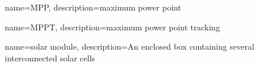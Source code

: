 {
  name=MPP,
  description={maximum power point}
}

{
  name=MPPT,
  description={maximum power point tracking}
}

{
  name=solar module,
  description={An enclosed box containing several interconnected solar cells}
}

\makeglossaries
\glsaddall
